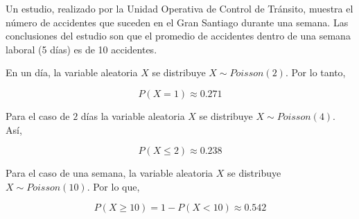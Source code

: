 
\addpoints
\question[10] Un estudio, realizado por la Unidad Operativa de Control de Tránsito, muestra el número de accidentes que suceden en el Gran Santiago durante una semana. Las conclusiones del estudio son que el promedio de accidentes dentro de una semana laboral (5 días) es de 10 accidentes.

\noaddpoints


\begin{solution}

En un día, la variable aleatoria $X$ se distribuye $X \sim Poisson(2)$. Por lo tanto, 

$$P(X=1) \approx 0.271$$

Para el caso de $2$ días la variable aleatoria $X$ se distribuye $X \sim Poisson(4)$. Así,

$$ P(X \leq2) \approx 0.238 $$

Para el caso de una semana, la variable aleatoria $X$ se distribuye $X \sim Poisson(10)$. Por lo que,

$$P(X\geq 10)= 1- P(X< 10) \approx 0.542$$

\end{solution}
